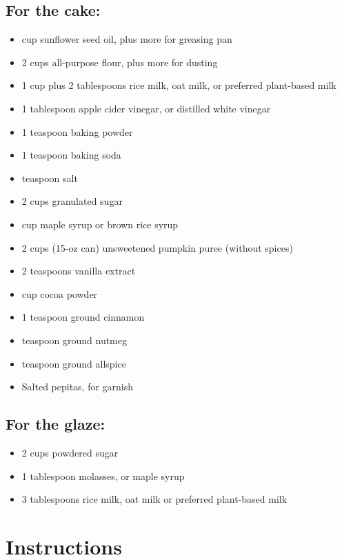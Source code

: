 \documentclass[12pt]{article}
\begin{document}
\begin{multicols}{2}
\subsection{For the cake:}
\begin{itemize}
    \item {} cup sunflower seed oil, plus more for greasing pan
    \item 2 cups all-purpose flour, plus more for dusting
    \item 1 cup plus 2 tablespoons rice milk, oat milk, or preferred plant-based milk
    \item 1 tablespoon apple cider vinegar, or distilled white vinegar
    \item 1 teaspoon baking powder
    \item 1 teaspoon baking soda
    \item {} teaspoon salt
    \item 2 cups granulated sugar
    \item {} cup maple syrup or brown rice syrup
    \item 2 cups (15-oz can) unsweetened pumpkin puree (without spices)
    \item 2 teaspoons vanilla extract
    \item {} cup cocoa powder
    \item 1 teaspoon ground cinnamon
    \item {} teaspoon ground nutmeg
    \item {} teaspoon ground allspice
    \item Salted pepitas, for garnish
\end{itemize}

\subsection{For the glaze:}
\begin{itemize}
    \item 2 cups powdered sugar
    \item 1 tablespoon molasses, or maple syrup
    \item 3 tablespoons rice milk, oat milk or preferred plant-based milk
\end{itemize}
\end{multicols}

\newpage

\section{Instructions}
\end{document}
